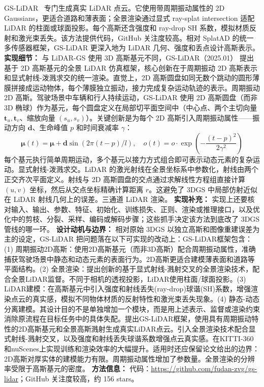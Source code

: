 GS-LiDAR~\cite{2501_13971} 专门生成真实 LiDAR 点云。它使用带周期振动属性的 2D Gaussians，更适合道路和薄表面；全景渲染通过显式 ray-splat intersection 适配 LiDAR 的柱面或球面投影。每个高斯还含强度和 ray-drop SH 系数，模拟材质反射和激光束丢失。该方法提供代码，GitHub 关注度较高。相对 SplatAD 的统一多传感器框架，GS-LiDAR 更深入地为 LiDAR 几何、强度和丢点设计高斯表示。
\textbf{实现细节：} 与 LiDAR-GS 使用 3D 高斯基元不同，GS-LiDAR（2025.01） 提出基于 2D 高斯基元的全景 LiDAR 仿真框架，核心创新在于周期振动 2D 高斯表示和显式射线-泼溅求交的统一渲染。直觉上，2D 高斯圆盘如同无数个跳动的圆形薄膜拼接成运动物体，每个薄膜独立振动，接力完成复杂运动轨迹的表示。周期振动 2D 高斯。驾驶场景中车辆和行人持续运动，GS-LiDAR 使用 2D 高斯圆盘（而非 3D 椭球）作为基元，每个圆盘定义在局部切平面空间中（中心点、两个主切向量 $\mathbf{t}_u, \mathbf{t}_v$、缩放向量 $(s_u, s_v)$）。关键创新是为每个 2D 高斯引入周期振动属性——振动方向 $\mathbf{d}$、生命峰值 $p$ 和时间衰减率 $\gamma$： \begin{equation*} \boldsymbol{\mu}(t) = \boldsymbol{\mu} + \mathbf{d} \sin(2\pi(t - p)/l), \quad o(t) = o \cdot \exp(-\frac{(t - p)^2}{2\gamma^2}) \end{equation*} 每个基元执行简单周期运动，多个基元以接力方式组合即可表示动态元素的复杂运动。显式射线-泼溅求交。LiDAR 的激光射线在全景坐标系中参数化，射线由两个正交齐次平面定义。射线与 2D 高斯圆盘的交点通过求解线性方程组直接计算 $(u, v)$ 坐标，然后从交点坐标精确计算距离 $r$。这避免了 3DGS 中局部仿射近似在 LiDAR 射线几何上的误差。三通道 LiDAR 渲染。
\textbf{实现补充：} 实现上还要核对输入、输出、参数、特征、初始化、训练损失、正则、渲染或推理接口，以及优化中的剪枝、分裂、采样、编码或解码步骤；这些抓手决定该方法到底改了 3DGS 管线的哪一环。
\textbf{设计动机与边界：} 相对原始 3DGS 以独立高斯和图像重建误差为主的设定，GS-LiDAR 把问题落在以下可实现的改动上：GS-LiDAR框架包含：(1) 周期振动2D高斯：使用2D高斯基元（而非3D高斯）配合周期振动属性，准确捕获驾驶场景中静态和动态元素的表面行为。2D高斯更适合建模薄表面和道路等平面结构。(2) 全景渲染：提出创新的基于显式射线-溅射交叉的全景渲染技术，配合全景LiDAR监督。不同于相机的透视投影，LiDAR使用柱面/球面投影。(3) LiDAR建模：在高斯基元中引入强度和射线丢失(ray-drop)球谐(SH)系数，增强渲染点云的真实感，模拟不同物体材质的反射特性和激光束丢失现象。(4) 静态-动态分离建模。其设计目的不是单独增加一个模块，而是用上述表示、监督或渲染约束消除原流程在目标任务中的具体失配。提出GS-LiDAR框架，使用具有周期振动特性的2D高斯基元和全景高斯溅射生成真实LiDAR点云。引入全景渲染技术配合显式射线-溅射交叉，以及强度和射线丢失球谐系数增强点云真实感。在KITTI-360和nuScenes上实现训练和渲染效率的大幅提升。适用时还应保留论文给出的边界：2D高斯对厚实体的建模能力有限。周期振动属性增加了参数量。全景渲染的分辨率受限于高斯基元的密度。
\textbf{方法信息：} 代码：\url{https://github.com/fudan-zvg/gs-lidar}；GitHub 关注度较高，约 156 stars。



